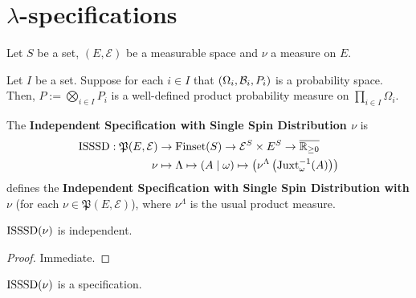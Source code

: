 \section{\texorpdfstring{$\lambda$}{Lambda}-specifications}

Let $S$ be a set, $(E, \mathcal{E})$ be a measurable space and $\nu$ a measure on $E$.

\begin{definition}
    \label{def:product-probability-measure}
    \leanok{}

    Let $I$ be a set. Suppose for each $i\in I$ that $(\Omega_i,\mathcal B_i,P_i)$ is a probability space. Then, $P:=\bigotimes_{i\in I}P_i$ is a well-defined product probability measure on $\prod_{i\in I}\Omega_i$.
\end{definition}

\begin{definition}
    \label{def:isssd}

    The \textbf{Independent Specification with Single Spin Distribution $\nu$} is
    \begin{align}
        \operatorname{ISSSD}:\mathfrak{P}(E, \mathcal{E})&\to\operatorname{Finset}(S)\to\mathcal{E}^S\times E^S\to\overline{\mathbb{R}_{\geq0}}\\
        \nu&\mapsto\Lambda\mapsto(A\mid\omega)\mapsto\left(\nu^\Lambda\left(\operatorname{Juxt}_{\omega}^{-1}(A)\right)\right)
    \end{align}
    defines the \textbf{Independent Specification with Single Spin Distribution with $\nu$} (for each $\nu\in\mathfrak{P}(E, \mathcal{E})$), where $\nu^\Lambda$ is the usual product measure.
\end{definition}

\begin{lemma}
    \label{lem:isssd-isIndep}
    \leanok{}

    $\operatorname{ISSSD}(\nu)$ is independent.
\end{lemma}
\begin{proof}

  Immediate.
\end{proof}


\begin{definition}
    \label{def:isssd-spec}
    \leanok

    $\operatorname{ISSSD}(\nu)$ is a specification.
\end{definition}

